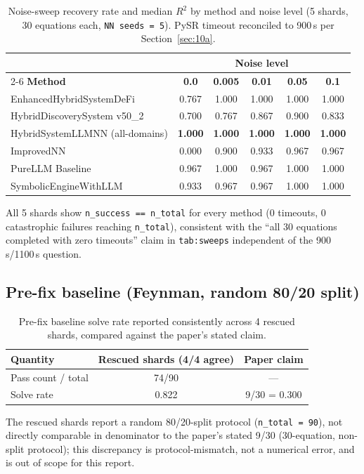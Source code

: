 \documentclass[11pt]{article}
\begin{document}
\begin{table}[h]
\centering
\caption{Noise-sweep recovery rate and median $R^2$ by method and noise
level (5 shards, 30 equations each, \texttt{NN seeds = 5}). PySR timeout
reconciled to 900\,s per Section~\ref{sec:10a}.}
\label{tab:sweeps}
\small
\begin{tabular}{@{}lccccc@{}}
\toprule
& \multicolumn{5}{c}{\textbf{Noise level}} \\
\cmidrule(lr){2-6}
\textbf{Method} & \textbf{0.0} & \textbf{0.005} & \textbf{0.01} & \textbf{0.05} & \textbf{0.1} \\
\midrule
EnhancedHybridSystemDeFi   & 0.767 & 1.000 & 1.000 & 1.000 & 1.000 \\
HybridDiscoverySystem v50\_2 & 0.700 & 0.767 & 0.867 & 0.900 & 0.833 \\
HybridSystemLLMNN (all-domains) & \textbf{1.000} & \textbf{1.000} & \textbf{1.000} & \textbf{1.000} & \textbf{1.000} \\
ImprovedNN                 & 0.000 & 0.900 & 0.933 & 0.967 & 0.967 \\
PureLLM Baseline           & 0.967 & 1.000 & 0.967 & 1.000 & 1.000 \\
SymbolicEngineWithLLM      & 0.933 & 0.967 & 0.967 & 1.000 & 1.000 \\
\bottomrule
\end{tabular}

\vspace{4pt}
{\small All 5 shards show \texttt{n\_success == n\_total} for every
method (0 timeouts, 0 catastrophic failures reaching \texttt{n\_total}),
consistent with the ``all 30 equations completed with zero timeouts''
claim in \texttt{tab:sweeps} independent of the 900\,s/1100\,s question.}
\end{table}

\subsection{Pre-fix baseline (Feynman, random 80/20 split)}

\begin{table}[h]
\centering
\caption{Pre-fix baseline solve rate reported consistently across 4
rescued shards, compared against the paper's stated claim.}
\label{tab:baseline}
\begin{tabular}{@{}lcc@{}}
\toprule
\textbf{Quantity} & \textbf{Rescued shards (4/4 agree)} & \textbf{Paper claim} \\
\midrule
Pass count / total & 74/90 & --- \\
Solve rate & 0.822 & 9/30 = 0.300 \\
\bottomrule
\end{tabular}

\vspace{4pt}
{\small The rescued shards report a random 80/20-split protocol
(\texttt{n\_total = 90}), not directly comparable in denominator to the
paper's stated 9/30 (30-equation, non-split protocol); this discrepancy
is protocol-mismatch, not a numerical error, and is out of scope for this
report.}
\end{table}
\end{document}
